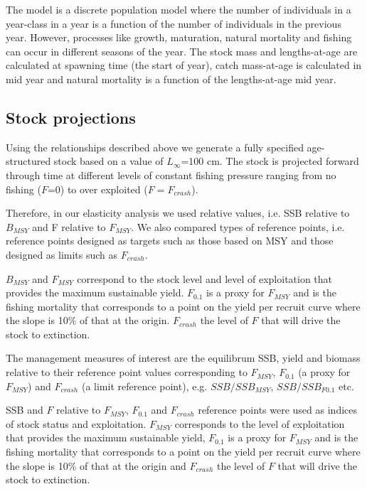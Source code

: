 \documentclass{pnastwo}
\begin{document}
\begin{article}
\begin{materials}
The model is a discrete population model where the number of individuals 
in a year-class in a year is a function of the number of individuals in 
the previous year. However, processes like growth, maturation, natural 
mortality and fishing can occur in different seasons of the year. The 
stock mass and lengths-at-age are calculated at spawning time (the start 
of year), catch mass-at-age is calculated in mid year and natural mortality 
is a function of the lengths-at-age mid year.  


\subsection{Stock projections}

Using the relationships described above we generate a fully specified 
age-structured stock based on a value of $L_{\infty}$=100 cm. The 
stock is projected forward through time at different levels of constant 
fishing pressure ranging from no fishing ($F$=0) to over exploited ($F=F_{crash}$).

Therefore, in our elasticity analysis we used relative values, i.e. SSB relative to $B_{MSY}$
and F relative to $F_{MSY}$. We also compared types of reference points, i.e. reference points designed as targets such as those
based on MSY and those designed as limits such as $F_{crash}$.

$B_{MSY}$ and $F_{MSY}$ correspond to the stock level and level of exploitation 
that provides the maximum sustainable yield.  $F_{0.1}$ is a proxy for $F_{MSY}$ and is 
the fishing mortality that corresponds to a point on the yield per recruit curve where the slope is
10\% of that at the origin. $F_{crash}$ the level of $F$ that will drive the stock to extinction.


The management measures of interest are the equilibrum SSB, yield and biomass 
relative to their reference point values corresponding to $F_{MSY}$, $F_{0.1}$ (a 
proxy for $F_{MSY}$) and $F_{crash}$ (a limit reference point), e.g. $SSB / SSB_{MSY}$, 
$SSB / SSB_{F0.1}$ etc.

SSB and $F$ relative to $F_{MSY}$, $F_{0.1}$ and $F_{crash}$ reference points were used 
as indices of stock status and exploitation. $F_{MSY}$ corresponds to the level of exploitation 
that provides the maximum sustainable yield,  $F_{0.1}$ is a proxy for $F_{MSY}$ and is 
the fishing mortality that corresponds to a point on the yield per recruit curve where the slope is
10\% of that at the origin and $F_{crash}$ the level of $F$ that will drive the stock to extinction.


\end{materials}
\end{article}
\end{document}
